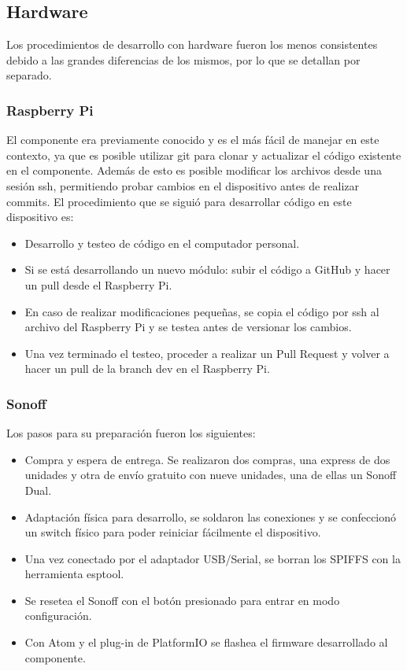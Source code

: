 \subsection{Hardware}

Los procedimientos de desarrollo con hardware fueron los menos consistentes debido a las grandes diferencias de los mismos, por lo que se detallan por separado.

\subsubsection{Raspberry Pi}

El componente era previamente conocido y es el más fácil de manejar en este contexto, ya que es posible utilizar git para clonar y actualizar el código existente en el componente. Además de esto es posible modificar los archivos desde una sesión ssh, permitiendo probar cambios en el dispositivo antes de realizar commits. El procedimiento que se siguió para desarrollar código en este dispositivo es:

\begin{itemize}
\item Desarrollo y testeo de código en el computador personal.
\item Si se está desarrollando un nuevo módulo: subir el código a GitHub y hacer un pull desde el Raspberry Pi.
\item En caso de realizar modificaciones pequeñas, se copia el código por ssh al archivo del Raspberry Pi y se testea antes de versionar los cambios.
\item Una vez terminado el testeo, proceder a realizar un Pull Request y volver a hacer un pull de la branch dev en el Raspberry Pi.

\end{itemize}

\subsubsection{Sonoff}

Los pasos para su preparación fueron los siguientes:

\begin{itemize}

\item Compra y espera de entrega. Se realizaron dos compras, una express de dos unidades y otra de envío gratuito con nueve unidades, una de ellas un Sonoff Dual.

\item Adaptación física para desarrollo, se soldaron las conexiones y se confeccionó un switch físico para poder reiniciar fácilmente el dispositivo.

\item Una vez conectado por el adaptador USB/Serial, se borran los SPIFFS con la herramienta esptool.

\item Se resetea el Sonoff con el botón presionado para entrar en modo configuración.

\item Con Atom y el plug-in de PlatformIO se flashea el firmware desarrollado al componente.

\end{itemize}
